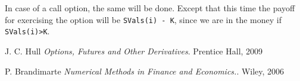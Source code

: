 \documentclass[11pt, fleqn]{article}
\begin{document}
In case of a call option, the same will be done. Except that this time the payoff for exercising the option will be \texttt{SVals(i) - K}, since we are in the money if \texttt{SVals(i)>K}.


\begin{thebibliography}{9}
J. C. Hull
\textit{Options, Futures and Other Derivatives}. 
Prentice Hall, 2009

P. Brandimarte
\textit{Numerical Methods in Finance and Economics.}. 
Wiley, 2006

\end{thebibliography}
\end{document}
